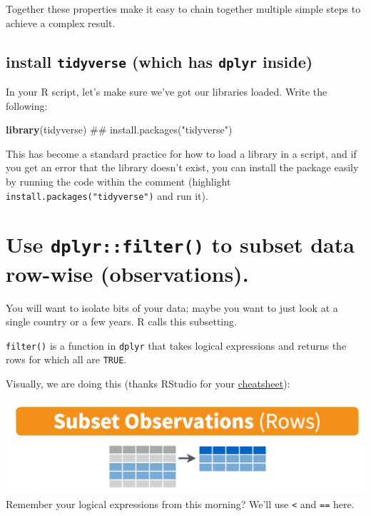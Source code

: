 \documentclass[]{book}
\newenvironment{Shaded}{\begin{snugshade}}{\end{snugshade}}
\newcommand{\KeywordTok}[1]{\textcolor[rgb]{0.13,0.29,0.53}{\textbf{{#1}}}}
\newcommand{\NormalTok}[1]{{#1}}
\theoremstyle{definition}
\theoremstyle{definition}
\theoremstyle{definition}
\theoremstyle{remark}
\begin{document}
Together these properties make it easy to chain together multiple simple
steps to achieve a complex result.

\subsection{\texorpdfstring{install \texttt{tidyverse} (which has
\texttt{dplyr}
inside)}{install tidyverse (which has dplyr inside)}}\label{install-tidyverse-which-has-dplyr-inside}

In your R script, let's make sure we've got our libraries loaded. Write
the following:

\begin{Shaded}
\begin{Highlighting}[]
\KeywordTok{library}\NormalTok{(tidyverse)     ## install.packages("tidyverse")}
\end{Highlighting}
\end{Shaded}

This has become a standard practice for how to load a library in a
script, and if you get an error that the library doesn't exist, you can
install the package easily by running the code within the comment
(highlight \texttt{install.packages("tidyverse")} and run it).

\section{\texorpdfstring{Use \texttt{dplyr::filter()} to subset data
row-wise
(observations).}{Use dplyr::filter() to subset data row-wise (observations).}}\label{use-dplyrfilter-to-subset-data-row-wise-observations.}

You will want to isolate bits of your data; maybe you want to just look
at a single country or a few years. R calls this subsetting.

\texttt{filter()} is a function in \texttt{dplyr} that takes logical
expressions and returns the rows for which all are \texttt{TRUE}.

Visually, we are doing this (thanks RStudio for your
\href{http://www.rstudio.com/wp-content/uploads/2015/02/data-wrangling-cheatsheet.pdf}{cheatsheet}):

\includegraphics{img/rstudio-cheatsheet-filter.png} Remember your
logical expressions from this morning? We'll use \texttt{\textless{}}
and \texttt{==} here.
\end{document}
